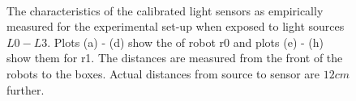 \begin{figure}
\centering
{}
\\
\caption{The characteristics of the calibrated light sensors as empirically measured for the experimental set-up when exposed to light sources $L0 - L3$. Plots (a) - (d) show the  of robot r0 and plots (e) - (h) show them for r1. The distances are measured from the front of the robots to the boxes. Actual distances from source to sensor are $12 cm$ further.}
\label{f:robots:calibration}
\end{figure}


